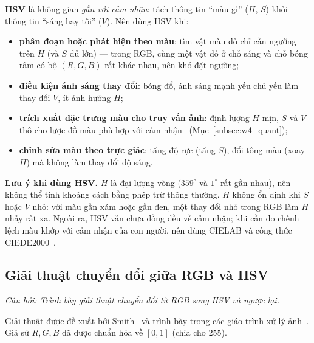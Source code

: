 \textbf{HSV} là không gian \emph{gắn với cảm nhận}: tách thông tin ``màu gì'' ($H$, $S$) khỏi thông tin ``sáng hay tối'' ($V$). Nên dùng HSV khi:
\begin{itemize}
    \item \textbf{phân đoạn hoặc phát hiện theo màu}: tìm vật màu đỏ chỉ cần ngưỡng trên $H$ (và $S$ đủ lớn) — trong RGB, cùng một vật đỏ ở chỗ sáng và chỗ bóng râm có bộ $(R, G, B)$ rất khác nhau, nên khó đặt ngưỡng;
    \item \textbf{điều kiện ánh sáng thay đổi}: bóng đổ, ánh sáng mạnh yếu chủ yếu làm thay đổi $V$, ít ảnh hưởng $H$;
    \item \textbf{trích xuất đặc trưng màu cho truy vấn ảnh}: định lượng $H$ mịn, $S$ và $V$ thô cho lược đồ màu phù hợp với cảm nhận~\citep{smith1996visualseek,manjunath2001color} (Mục~\ref{subsec:w4_quant});
    \item \textbf{chỉnh sửa màu theo trực giác}: tăng độ rực (tăng $S$), đổi tông màu (xoay $H$) mà không làm thay đổi độ sáng.
\end{itemize}

\textbf{Lưu ý khi dùng HSV.} $H$ là đại lượng vòng ($359^\circ$ và $1^\circ$ rất gần nhau), nên không thể tính khoảng cách bằng phép trừ thông thường. $H$ không ổn định khi $S$ hoặc $V$ nhỏ: với màu gần xám hoặc gần đen, một thay đổi nhỏ trong RGB làm $H$ nhảy rất xa. Ngoài ra, HSV vẫn chưa đồng đều về cảm nhận; khi cần đo chênh lệch màu khớp với cảm nhận của con người, nên dùng CIELAB và công thức CIEDE2000~\citep{sharma2005ciede2000}.

\subsection{Giải thuật chuyển đổi giữa RGB và HSV}
\label{subsec:w4_rgb_hsv_alg}

\textit{Câu hỏi: Trình bày giải thuật chuyển đổi từ RGB sang HSV và ngược lại.}

Giải thuật được đề xuất bởi Smith~\citep{smith1978color} và trình bày trong các giáo trình xử lý ảnh~\citep{gonzalez2018digital}. Giả sử $R, G, B$ đã được chuẩn hóa về $[0, 1]$ (chia cho $255$).


